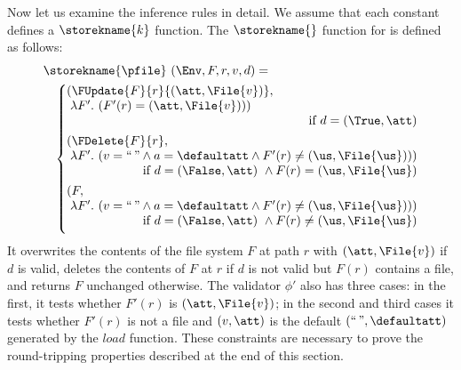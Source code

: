 Now let us examine the inference rules in detail. We assume that each
constant defines a $\storekname{k}$ function. The $\storekname{}$
function for \pfile{} is defined as follows:
%
\[
\begin{array}{l}
\storekname{\pfile}~(\Env,F,r,v,d) =\\[1ex]
\quad 
\left\{
\begin{array}{@{}l@{}}
  (\FUpdate{F}{r}{(\att,\File{v})},\\            
  \; \lambda F'.~ (F'(r) = (\att,\File{v})))\\
  \hfill\text{if}~d = (\True,\att)\\[1ex]
  (\FDelete{F}{r},\\                             
  \; \lambda F'.~ (v=\text{``}{\,}\text{''} \wedge a=\defaultatt \wedge F'(r) \neq (\us,\File{\us})))\\
  \hfill\text{if}~d = (\False,\att)~\wedge F(r) = (\us,\File{\us})\\[1ex]
  (F,\\              
  \; \lambda F'.~ (v=\text{``}{\,}\text{''} \wedge a=\defaultatt \wedge F'(r) \neq (\us,\File{\us})))\\
  \hfill\text{if}~d = (\False,\att)~\wedge F(r) \neq (\us,\File{\us})\\[1ex]
\end{array}\right.
\end{array}\]
%
It overwrites the contents of the file system $F$ at path $r$ with
$(\att,\File{v})$ if $d$ is valid, deletes the contents of $F$ at $r$
if $d$ is not valid but $F(r)$ contains a file, and returns $F$
unchanged otherwise. The validator $\phi'$ also has three cases: in
the first, it tests whether $F'(r)$ is $(\att,\File{v})$; in the
second and third cases it tests whether $F'(r)$ is not a file and
$(v,\att)$ is the default $(\text{``}{\,}\text{''}, \defaultatt)$
generated by the $\mathit{load}$ function. These constraints are necessary to
prove the round-tripping properties described at the end of this
section.

